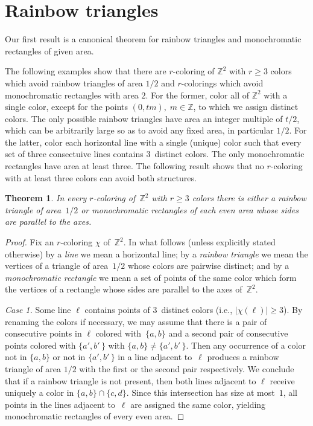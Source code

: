 \documentclass[a4paper, 11pt,reqno]{amsart}
\newtheorem{theorem}{Theorem}
\theoremstyle{definition}
\newcommand{\Z}{\mbox{${\mathbb Z}$}}
\begin{document}
\section{Rainbow triangles}


{Our first result is a canonical theorem for rainbow triangles and monochromatic rectangles of given area.}

{The following examples show that there are $r$-coloring of $\Z^2$  with $r\ge 3$ colors which avoid
rainbow triangles of area $1/2$ and $r$-colorings which avoid monochromatic rectangles with area $2$.
For the former,
color all of $\Z^2$ with a single color, except for the
points $(0,tm), \; m\in \Z$, to which we assign distinct colors.
The only possible rainbow triangles have area an integer multiple of $t/2$, which can be arbitrarily large so as to avoid any
fixed area, in particular $1/2$. For the latter, color each horizontal line with a single (unique) color such
that every set of three consectuive lines contains 3~distinct colors. The only monochromatic rectangles have area at least
three. The following result shows that no $r$-coloring with at least three colors can  avoid both structures.

 \begin{theorem}\label{t:rb-triangle-vs-even-mon-rects}
      In every $r$-coloring of~$\Z^2$ with $r\ge 3$ colors there is either
      a rainbow triangle of area~$1/2$ or monochromatic rectangles
      of each even area whose sides are parallel to the axes.
    \end{theorem}

    \begin{proof}
      Fix an $r$-coloring $\chi$ of~$\Z^2\!$.
      In what follows (unless explicitly stated otherwise) by a \emph{ line} we mean a horizontal line;
      by a \emph{rainbow triangle} we mean the vertices of a triangle of area~$1/2$
      whose colors are pairwise distinct;
      and by a \emph{monochromatic rectangle} we
      mean a set of points of the same color which form the vertices of a rectangle
      whose sides are parallel to the axes of~$\Z^2\!$.

      \medskip
      \emph{Case 1.} Some line $\ell$ contains points of $3$~distinct colors
      (i.e., $\bigl|\chi(\ell)\bigr|\ge 3$).
      By renaming the colors if necessary, we may assume that there is a  pair  of consecutive points
      in $\ell$ colored with~$\{a,b\}$ and a second pair of consecutive points colored with  $\{a',b'\,\}$
with $\{a,b\}\neq \{a',b'\,\}$.
      Then any occurrence of a color not in $\{a,b\}$ or not in $\{a',b'\,\}$  in a line adjacent to~$\ell$
      produces a rainbow triangle of area $1/2$ with the first or the second pair respectively.
      We conclude that if a rainbow triangle is not present, then both lines adjacent to $\ell$ receive uniquely a color in $\{a,b\}\cap \{c,d\}$. Since this intersection has size at most~$1$, all points in the lines adjacent to~$\ell$ are assigned the same color, yielding monochromatic rectangles of every even area.


\end{proof}}
\end{document}
